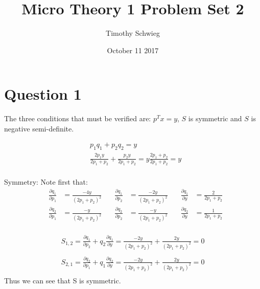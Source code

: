 \documentclass[10pt, letterpaper]{paper}
\title{ Micro Theory 1 Problem Set 2}
\author{ Timothy Schwieg }
\date{ October 11 2017 }
\begin{document}
\maketitle

\section*{Question 1}
The three conditions that must be verified are: $p^T x = y$, $S$ is symmetric and $S$ is negative semi-definite.

\begin{eqnarray*}
&p_1 q_1 + p_2 q_2 = y\\
&\frac{ 2 p_1 y }{ 2p_1 + p_2} + \frac{ p_2 y }{ 2p_1 + p_2 } = y \frac{ 2p_1 + p_2 }{ 2p_1 + p_2 } = y\\
\end{eqnarray*}

Symmetry: Note first that:
\begin{equation*}
\begin{alignedat}{6}
&\frac{ \partial q_1}{\partial p_1} &= \frac{ -4y}{ {(2p_1 + p_2)}^2 } \quad& \frac{ \partial q_1 }{ \partial p_2} &= \frac{ -2y }{ {(2p_1 + p_2)}^2 } \quad& \frac{ \partial q_1}{ \partial y } &= \frac{ 2 }{ 2p_1 + p_2 }\\
&\frac{ \partial q_2 }{ \partial p_1} &= \frac{ -y}{ {(2p_1 + p_2)}^2 } \quad&\frac{ \partial q_2}{ \partial p_2} &= \frac{ -y}{ {(2p_1 + p_2)}^2 } \quad &\frac{ \partial q_2}{ \partial y } &= \frac{ 1}{ 2p_1 + p_2 }\\
\end{alignedat}
\end{equation*}

\begin{eqnarray*}
S_{1,2} = \frac{ \partial q_1 }{\partial p_2} + q_2 \frac{ \partial q_1}{\partial y } = \frac{ -2y }{ {(2p_1 + p_2)}^2 } + \frac{ 2y }{ {(2p_1 + p_2)}^2 }  = 0\\
\\
S_{2,1} = \frac{ \partial q_2 }{\partial p_1} + q_1 \frac{ \partial q_2}{\partial y} = \frac{ -2y}{ {(2p_1 + p_2)}^2 } + \frac{ 2y}{ {(2p_1 + p_2)}^2 } = 0\\
\end{eqnarray*}
Thus we can see that S is symmetric.
\end{document}
